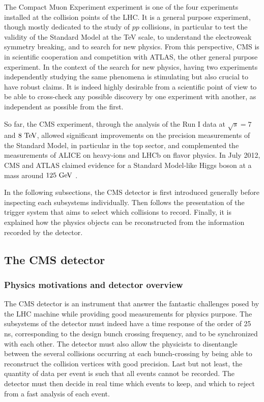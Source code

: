     The Compact Muon Experiment experiment is one of the four experiments installed
    at the collision points of the LHC. It is a general purpose experiment, though mostly dedicated
    to the study of $pp$ collisions, in particular to test the validity of the Standard
    Model at the TeV scale, to understand the electroweak symmetry breaking, and to search for new physics. From this
    perspective, CMS is in scientific cooperation and competition with ATLAS, the
    other general purpose experiment. In the context of the search for new physics,
    having two experiments independently studying the same phenomena is
    stimulating but also crucial to have robust claims. It is indeed highly desirable
    from a scientific point of view to be able to cross-check any possible discovery
    by one experiment with another, as independent as possible from the first.

    So far, the CMS experiment, through the analysis of the Run I data at
    $\sqrt{s} = 7$ and $8~\text{TeV}$, allowed significant improvements on the precision measurements
    of the Standard Model, in particular in the top sector, and complemented the
    measurements of ALICE on heavy-ions and LHCb on flavor physics. In July 2012, CMS
    and ATLAS claimed evidence for a Standard Model-like Higgs boson at a mass around
    $125~\text{GeV}$ \cite{CMSHiggs, ATLASHiggs}.

    In the following subsections, the CMS detector is first introduced generally before inspecting
    each subsystems individually. Then follows the presentation of the trigger system
    that aims to select which collisions to record. Finally, it is
    explained how the physics objects can be reconstructed from the information
    recorded by the detector.

    \subsection{The CMS detector}

        \subsubsection{Physics motivations and detector overview}

    The CMS detector \cite{CMSdetector} is an instrument that answer the fantastic
    challenges posed by the LHC machine while providing good measurements for physics purpose.
    The subsystems of the detector must indeed have a time response of the order of 25 ns,
    corresponding to the design bunch crossing frequency, and to be synchronized with
    each other. The detector must also allow the physicists to disentangle between the
    several collisions occurring at each bunch-crossing by being able to
    reconstruct the collision vertices with good precision. Last but not least,
    the quantity of data per event is such that all events cannot be recorded. The
    detector must then decide in real time which events to keep, and which to reject
    from a fast analysis of each event.

